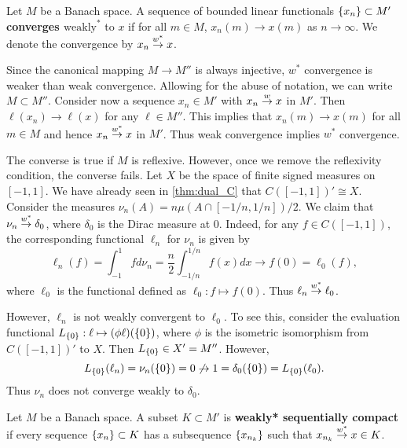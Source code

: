 \begin{definition}
    Let $M$ be a Banach space. A sequence of bounded linear functionals 
    $\left\{ {x_n} \right\}\subset M'$ \textbf{converges $\text{weakly}^*$} to $x$ if 
    for all $m\in M$, $x_n(m)\to x(m)$ as $n\to\infty$. We denote the 
    convergence by $x_n\overset{w^*}{\to} x$.
\end{definition}
\begin{remark}
    Since the canonical mapping $M\to M''$ is always injective, $w^*$ 
    convergence is weaker than weak convergence. Allowing for the abuse 
    of notation, we can write $M\subset M''$. Consider now a sequence 
    $x_n\in M'$ with $x_n\overset{w}{\to} x$ in $M'$. Then $\ell(x_n)\to\ell(x)$ for 
    any $\ell\in M''$. This implies that $x_n(m)\to x(m)$ for all $m\in M$ 
    and hence $x_n\overset{w^*}{\to} x$ in $M'$. Thus weak convergence implies $w^*$ 
    convergence. 

    The converse is true if $M$ is reflexive. However, once we remove the 
    reflexivity condition, the converse fails. Let $X$ be the space of finite 
    signed measures on $[-1,1]$. We have already seen in \cref{thm:dual_C} that 
    $C([-1,1])'\cong X$. Consider the measures $\nu_n(A) = n\mu(A\cap[-1/n,1/n])/2$. 
    We claim that $\nu_n\overset{w^*}{\to} \delta_0$, where $\delta_0$ is the Dirac measure 
    at $0$. Indeed, for any $f\in C([-1,1])$, the corresponding functional $\ell_n$ 
    for $\nu_n$ is given by
    \begin{equation*}
        \ell_n(f) = \int_{-1}^1 f d\nu_n = \frac{n}{2}\int_{-1/n}^{1/n} f(x)dx
        \to f(0) = \ell_0(f),
    \end{equation*}
    where $\ell_0$ is the functional defined as $\ell_0:f\mapsto f(0)$. 
    Thus $\ell_n\overset{w^*}{\to}\ell_0$.

    However, $\ell_n$ is not weakly convergent to $\ell_0$. To see this, consider 
    the evaluation functional $L_{\left\{ {0} \right\}}:\ell\mapsto(\phi\ell)(\left\{ {0} \right\})$, where 
    $\phi$ is the isometric isomorphism from $C([-1,1])'$ to $X$. 
    Then $L_{\left\{ {0} \right\}}\in X' = M''$. However, 
    \begin{equation*}
        L_{\left\{ {0} \right\}}(\ell_n) = \nu_n(\left\{ {0} \right\}) = 0 \not\to 1 = \delta_0(\left\{ {0} \right\}) = L_{\left\{ {0} \right\}}(\ell_0).
    \end{equation*}
    Thus $\nu_n$ does not converge weakly to $\delta_0$.
\end{remark}

\begin{definition}
    Let $M$ be a Banach space. A subset $K\subset M'$ is \textbf{weakly* sequentially compact} 
    if every sequence $\left\{ {x_n} \right\}\subset K$ has a subsequence $\left\{ {x_{n_k}} \right\}$ such that 
    $x_{n_k}\overset{w^*}{\to} x\in K$.
\end{definition}

